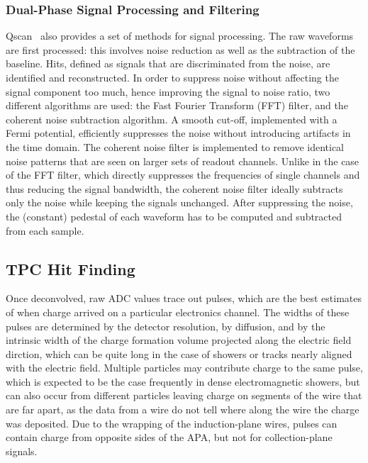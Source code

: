 \subsubsection{Dual-Phase Signal Processing and Filtering}

Qscan~\cite{lussi:thesis} also provides a set of methods for signal processing. 
The raw waveforms are first processed: this involves noise reduction as well as the subtraction of the baseline.
Hits, defined as signals that are discriminated from the noise, are identified and reconstructed.
In order to suppress noise without affecting the signal component too much, hence improving the signal to noise ratio, 
two different algorithms are used: the Fast Fourier Transform (FFT) filter, and the coherent noise subtraction algorithm.
A smooth cut-off, implemented with a Fermi potential, efficiently suppresses the noise without introducing artifacts in the
time domain.
The coherent noise filter is implemented to remove identical noise patterns that are seen on larger sets of readout channels. 
Unlike in the case of the FFT filter, which directly suppresses the frequencies of single 
channels and thus reducing the signal bandwidth, the coherent noise filter ideally subtracts only the noise while keeping the signals unchanged.
After suppressing the noise, the (constant) pedestal of each waveform has to be computed and subtracted from each sample.

\subsection{TPC Hit Finding}
\label{annex:reconstruction-single-phase-hit-find}

Once deconvolved, raw ADC values trace out pulses, which are the best
estimates of when charge arrived on a particular electronics channel.
The widths of these pulses are determined by the detector resolution,
by diffusion, and by the intrinsic width of the charge formation
volume projected along the electric field dirction, which can be quite
long in the case of showers or tracks nearly aligned with the electric
field.  Multiple particles may contribute charge to the same pulse,
which is expected to be the case frequently in dense electromagnetic
showers, but can also occur from different particles leaving charge on
segments of the wire that are far apart, as the data from a wire do
not tell where along the wire the charge was deposited.  
Due to the wrapping of the induction-plane wires, pulses can contain charge
from opposite sides of the APA, but not for collection-plane signals.

